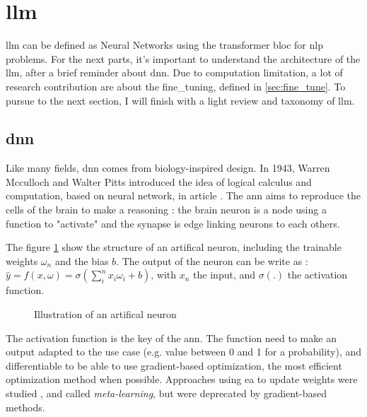 \section{\acrfull{llm}}
\label{sec:llm}
\acrshort{llm} can be defined as Neural Networks using the \Gls{transformer} bloc for \acrfull{nlp} problems. For the next parts, it's important to understand the architecture of the \acrshort{llm}, after a brief reminder about \acrshort{dnn}. Due to computation limitation, a lot of research contribution are about the \Gls{fine_tuning}, defined in \ref{sec:fine_tune}. To pursue to the next section, I will finish with a light review and taxonomy of \acrshort{llm}. 

\subsection{\acrfull{dnn}}
\label{sec:dnn}
Like many fields, \acrshort{dnn} comes from biology-inspired design. In 1943,  Warren Mcculloch and Walter Pitts introduced the idea of logical calculus and computation, based on neural network, in article \cite{mcculloch_logical_1943}. The \acrfull{ann} aims to reproduce the cells of the brain to make a reasoning : the brain neuron is a node using a function to "activate" and the synapse is edge linking neurons to each others.  


The figure \ref{fig:artifical_neuron} show the structure of an artifical neuron, including the trainable weights $\omega_n$ and the bias $b$. The output of the neuron can be write as : $\hat{y} = f(x,\omega) =  \sigma(\sum_i^n x_i \omega_i +b)$, with $x_n$ the input, and $\sigma(.)$ the activation function.

\begin{figure}[h]
    \centering
    
    \caption{Illustration of an artifical neuron\cite{these_DNN}}
    \label{fig:artifical_neuron}
\end{figure}


The activation function is the key of the \acrshort{ann}. The function need to make an output adapted to the use case (e.g. value between 0 and 1 for a probability), and differentiable to be able to use gradient-based optimization, the most efficient optimization method when possible. Approaches using \acrfull{ea} to update weights were studied \cite{X,X}, and called \textit{meta-learning}, but were deprecated by gradient-based methods. 

